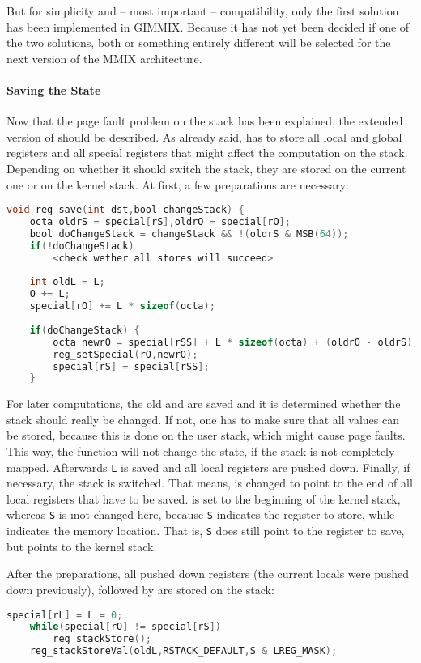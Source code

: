 But for simplicity and -- most important -- compatibility, only the first solution has been implemented in GIMMIX. Because it has not yet been decided if one of the two solutions, both or something entirely different will be selected for the next version of the MMIX architecture.

\paragraph{Saving the State}

Now that the page fault problem on the stack has been explained, the extended version of  should be described. As already said,  has to store all local and global registers and all special registers that might affect the computation on the stack. Depending on whether it should switch the stack, they are stored on the current one or on the kernel stack. At first, a few preparations are necessary:
\begin{lstlisting}[language=C,caption={Implementation of {\tt reg\_save}, part 1 (partially pseudo-code)}]
void reg_save(int dst,bool changeStack) {
	octa oldrS = special[rS],oldrO = special[rO];
	bool doChangeStack = changeStack && !(oldrS & MSB(64));
	if(!doChangeStack)
		<check wether all stores will succeed>
	
	int oldL = L;
	O += L;
	special[rO] += L * sizeof(octa);
	
	if(doChangeStack) {
		octa newrO = special[rSS] + L * sizeof(octa) + (oldrO - oldrS);
		reg_setSpecial(rO,newrO);
		special[rS] = special[rSS];
	}
\end{lstlisting}
For later computations, the old  and  are saved and it is determined whether the stack should really be changed. If not, one has to make sure that all values can be stored, because this is done on the user stack, which might cause page faults. This way, the function will not change the state, if the stack is not completely mapped. Afterwards {\tt L} is saved and all local registers are pushed down. Finally, if necessary, the stack is switched. That means,  is changed to point to the end of all local registers that have to be saved.  is set to the beginning of the kernel stack, whereas {\tt S} is \i{not} changed here, because {\tt S} indicates the register to store, while  indicates the memory location. That is, {\tt S} does still point to the register to save, but  points to the kernel stack.

After the preparations, all pushed down registers (the current locals were pushed down previously), followed by  are stored on the stack:
\begin{lstlisting}[language=C,caption={Implementation of {\tt reg\_save}, part 2}]
	special[rL] = L = 0;
	while(special[rO] != special[rS])
		reg_stackStore();
	reg_stackStoreVal(oldL,RSTACK_DEFAULT,S & LREG_MASK);
\end{lstlisting}

